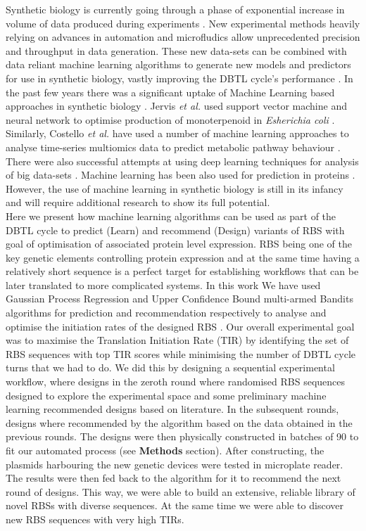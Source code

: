 \documentclass{article}
\begin{document}
Synthetic biology is currently going through a phase of exponential increase in volume of data produced during experiments \cite{Freemont2019}. 
New experimental methods heavily relying on advances in automation and microfludics allow unprecedented precision and throughput in data generation.
These new data-sets can be combined with data reliant machine learning algorithms to generate new models and predictors for use in synthetic biology, vastly improving the DBTL cycle's performance \cite{Camacho2018}. 
In the past few years there was a significant uptake of Machine Learning based approaches in synthetic biology \cite{LAWSON2021}.
Jervis \emph{et al.} used support vector machine and neural network to optimise production of monoterpenoid in \emph{Esherichia coli} \cite{Jervis2019}.
Similarly, Costello \emph{et al.} have used a number of machine learning approaches to analyse time-series multiomics data to predict metabolic pathway behaviour \cite{Costello2018}.
There were also successful attempts at using deep learning techniques for analysis of big data-sets \cite{Alipanahi2015,Angermueller2016}. Machine learning has been also used for prediction in proteins \cite{Yang2018}.
However, the use of machine learning in synthetic biology is still in its infancy and will require additional research to show its full potential. \\
Here we present how machine learning algorithms can be used as part of the DBTL cycle to predict (Learn) and recommend (Design) variants of RBS with goal of optimisation of associated protein level expression. 
RBS being one of the key genetic elements controlling protein expression and at the same time having a relatively short sequence is a perfect target for establishing workflows that can be later translated to more complicated systems.
In this work We have used Gaussian Process Regression and Upper Confidence Bound multi-armed Bandits algorithms for prediction and recommendation respectively to analyse and optimise the initiation rates of the designed RBS \cite{desautels2012parallelizing, Rasmussen2004}.
Our overall experimental goal was to maximise the Translation Initiation Rate (TIR) by identifying the set of RBS sequences with top TIR scores while minimising the number of DBTL cycle turns that we had to do.
We did this by designing a sequential experimental workflow, where designs in the zeroth round where randomised RBS sequences designed to explore the experimental space and some preliminary machine learning recommended designs based on literature. 
In the subsequent rounds, designs where recommended by the algorithm based on the data obtained in the previous rounds. 
The designs were then physically constructed in batches of 90 to fit our automated process (see \textbf{Methods} section).
After constructing, the plasmids harbouring the new genetic devices were tested in microplate reader.
The results were then fed back to the algorithm for it to recommend the next round of designs.
This way, we were able to build an extensive, reliable library of novel RBSs with diverse sequences.
At the same time we were able to discover new RBS sequences with very high TIRs.\\
\end{document}
